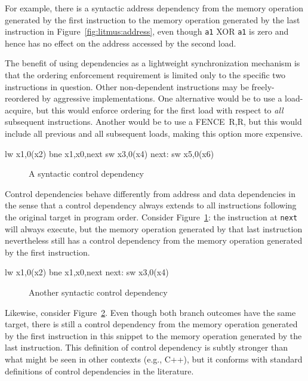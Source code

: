 For example, there is a syntactic address
dependency from the memory operation generated by the first instruction to the memory operation generated by the last instruction in
Figure~\ref{fig:litmus:address}, even though {\tt a1} XOR {\tt a1} is zero and
hence has no effect on the address accessed by the second load.

The benefit of using dependencies as a lightweight synchronization mechanism is that the ordering enforcement requirement is limited only to the specific two instructions in question.
Other non-dependent instructions may be freely-reordered by aggressive implementations.
One alternative would be to use a load-acquire, but this would enforce ordering for the first load with respect to {\em all} subsequent instructions.
Another would be to use a FENCE~R,R, but this would include all previous and all subsequent loads, making this option more expensive.

\begin{verbbox}
      lw  x1,0(x2)
      bne x1,x0,next
      sw  x3,0(x4)
next: sw  x5,0(x6)
\end{verbbox}
\begin{figure}[h!]
  \centering\small
  \theverbbox
  \caption{A syntactic control dependency}
  \label{fig:litmus:control1}
\end{figure}

Control dependencies behave differently from address and data dependencies in the sense that a control dependency always extends to all instructions following the original target in program order.
Consider Figure~\ref{fig:litmus:control1}: the instruction at {\tt next} will always execute, but the memory operation generated by that last instruction nevertheless still has a control dependency from the memory operation generated by the first instruction.

\begin{verbbox}
        lw  x1,0(x2)
        bne x1,x0,next
  next: sw  x3,0(x4)
\end{verbbox}
\begin{figure}[h!]
  \centering\small
  \theverbbox
  \caption{Another syntactic control dependency}
  \label{fig:litmus:control2}
\end{figure}

Likewise, consider Figure~\ref{fig:litmus:control2}.
Even though both branch outcomes have the same target, there is still a control dependency from the memory operation generated by the first instruction in this snippet to the memory operation generated by the last instruction.
This definition of control dependency is subtly stronger than what might be seen in other contexts (e.g., C++), but it conforms with standard definitions of control dependencies in the literature.


